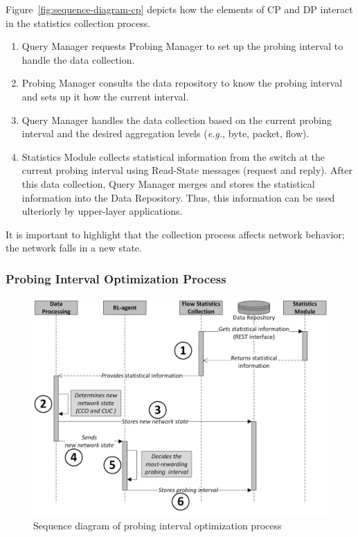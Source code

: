 Figure~\ref{fig:sequence-diagram-cp} depicts how the elements of CP and DP interact in the statistics collection process. 

\begin{enumerate}[label=\protect\circled{\arabic*}]
    \item Query Manager requests Probing Manager to set up the probing interval to handle the data collection.
    \item Probing Manager consults the data repository to know the probing interval and sets up it how the current interval.
    \item Query Manager handles the data collection based on the current probing interval and the desired aggregation levels (\textit{e.g.}, byte, packet, flow).
    \item Statistics Module collects statistical information from the switch at the current probing interval using Read-State messages (request and reply). After this data collection, Query Manager merges  and stores  the statistical information into the Data Repository. Thus, this information can be used ulteriorly by upper-layer applications.
\end{enumerate}

It is important to highlight that the collection process affects network behavior; the network falls in a new state.

\subsubsection{Probing Interval Optimization Process}
\label{subsec:probing-interval-optimization-ptocess}

\begin{figure}[h!]
    \centering
    \includegraphics[width=0.90\columnwidth]{figures/Figure6-IPro-Sequence-diagram-mp}
    \caption{Sequence diagram of probing interval optimization process}
    \label{fig:sequence-diagram-mp}
\end{figure}

